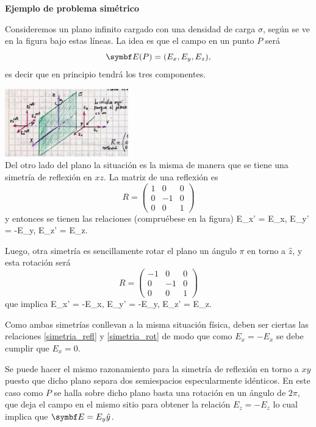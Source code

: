 \documentclass[10pt,oneside]{CBFT_book}
\begin{document}
\begin{ejemplo}{\bf Ejemplo de problema simétrico}

Consideremos un plano infinito cargado con una densidad de carga $\sigma$, según se
ve en la figura bajo estas líneas. 
La idea es que el campo en un punto $P$ será 
\[
	\vb{E}(P) = (E_x, E_y, E_z), 
\]
es decir que en principio tendrá los tres componentes.

\includegraphics[width=0.4\textwidth]{images/fig_ft1_ej_plano_cargado.jpg}\\

Del otro lado del plano la situación es la misma de manera que se tiene una simetría de 
reflexión en $xz$. La matriz de una reflexión es 
\[
	R = \begin{pmatrix}
		1 & 0 & 0 \\
		0 & -1 & 0 \\
		0 & 0 & 1
	\end{pmatrix}
\]
y entonces se tienen las relaciones (compruébese en la figura)
\be
	E_x' = E_x, \qquad E_y' = -E_y, \qquad E_z' = E_z.
	\label{simetria_refl}
\ee

Luego, otra simetría es sencillamente rotar el plano un ángulo $\pi$ en torno a $\hat{z}$,
y esta rotación será 
\[
	R = \begin{pmatrix}
		-1 & 0 & 0 \\
		0 & -1 & 0 \\
		0 & 0 & 1
	\end{pmatrix}
\]
que implica 
\be
	E_x' = -E_x, \qquad E_y' = -E_y, \qquad E_z' = E_z.
	\label{simetria_rot}
\ee

Como ambas simetrías conllevan a la misma situación física, deben ser ciertas las relaciones 
\eqref{simetria_refl} y \eqref{simetria_rot} de modo que como $E_x = - E_x$ se debe cumplir 
que $E_x = 0$.

Se puede hacer el mismo razonamiento para la simetría de reflexión en torno a $xy$ puesto que
dicho plano separa dos semiespacios especularmente idénticos. En este caso como $P$ se halla
sobre dicho plano basta una rotación en un ángulo de $2\pi$, que deja el campo en el mismo
sitio para obtener la relación $E_z = - E_z$ lo cual implica que $\vb{E} = E_y \hat{y}$.
\end{ejemplo}
\end{document}
